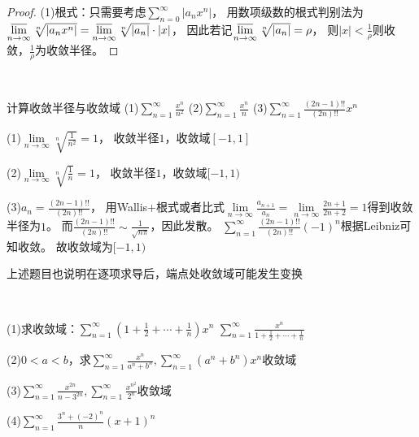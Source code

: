 \begin{proof}
  (1)根式：只需要考虑$\sum\limits_{n = 0}^{\infty}|a_nx^n|$，
  用数项级数的根式判别法为$\varlimsup \limits_{n \rightarrow \infty} \sqrt[n]{|a_nx^n|} = \varlimsup \limits_{n \rightarrow \infty} \sqrt[n]{|a_n|} \cdot |x|$，
  因此若记$\varlimsup \limits_{n \rightarrow \infty} \sqrt[n]{|a_n|} = \rho$，
  则$|x| < \frac{1}{\rho}$则收敛，$\frac{1}{\rho}$为收敛半径。
\end{proof}

~

\begin{exercise}[计算收敛半径]
  计算收敛半径与收敛域
  (1)$\sum\limits_{n = 1}^{\infty}\frac{x^n}{n^2}$
  (2)$\sum\limits_{n = 1}^{\infty}\frac{x^n}{n}$
  (3)$\sum\limits_{n = 1}^{\infty}\frac{(2n-1)!!}{(2n)!!}x^n$
\end{exercise}

\begin{solution}
  (1)$\lim \limits _{n \rightarrow \infty} \sqrt[n]{\frac{1}{n^2}} = 1$，
  收敛半径$1$，收敛域$[-1,1]$

  (2)$\lim \limits _{n \rightarrow \infty} \sqrt[n]{\frac{1}{n}} = 1$，
  收敛半径$1$，收敛域$[-1,1)$

  (3)$a_n = \frac{(2n-1)!!}{(2n)!!}$，
  用Wallis+根式或者比式$\lim \limits _{n \rightarrow \infty} \frac{a_{n+1}}{a_n} = \lim \limits _{n \rightarrow \infty} \frac{2n+1}{2n+2} = 1$得到收敛半径为$1$。
  而$\frac{(2n-1)!!}{(2n)!!} \sim \frac{1}{\sqrt{n\pi}}$，因此发散。
  $\sum\limits_{n = 1}^{\infty}\frac{(2n-1)!!}{(2n)!!}(-1)^n$根据Leibniz可知收敛。
  故收敛域为$[-1,1)$
\end{solution}

\begin{note}
  上述题目也说明在逐项求导后，端点处收敛域可能发生变换
\end{note}

~

\begin{exercise}[常规格式幂级数]
  (1)求收敛域：$\sum\limits_{n = 1}^{\infty}(1 + \frac{1}{2} + \cdots + \frac{1}{n})x^n$
  $\sum\limits_{n = 1}^{\infty}\frac{x^n}{1 + \frac{1}{2} + \cdots + \frac{1}{n}}$

  (2)$0 < a < b$，求$\sum\limits_{n = 1}^{\infty}\frac{x^n}{a^n + b^n}, \sum\limits_{n = 1}^{\infty}(a^n + b^n)x^n$收敛域

  (3)$\sum\limits_{n = 1}^{\infty}\frac{x^{2n}}{n - 3^{2n}}, \sum\limits_{n = 1}^{\infty}\frac{x^{n^2}}{2^n}$收敛域

  (4)$\sum\limits_{n = 1}^{\infty}\frac{3^n + (-2)^n}{n}(x + 1)^n$
\end{exercise}

